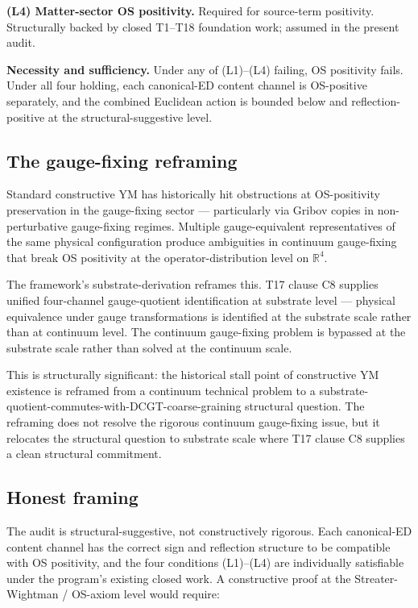\documentclass[11pt,a4paper]{article}
\begin{document}
\textbf{(L4) Matter-sector OS positivity.} Required for source-term positivity. Structurally backed by closed T1--T18 foundation work; assumed in the present audit.

\textbf{Necessity and sufficiency.} Under any of (L1)--(L4) failing, OS positivity fails. Under all four holding, each canonical-ED content channel is OS-positive separately, and the combined Euclidean action is bounded below and reflection-positive at the structural-suggestive level.

\subsection{The gauge-fixing reframing}

Standard constructive YM has historically hit obstructions at OS-positivity preservation in the gauge-fixing sector --- particularly via Gribov copies in non-perturbative gauge-fixing regimes. Multiple gauge-equivalent representatives of the same physical configuration produce ambiguities in continuum gauge-fixing that break OS positivity at the operator-distribution level on $\mathbb{R}^{4}$.

The framework's substrate-derivation reframes this. T17 clause C8 supplies unified four-channel gauge-quotient identification at substrate level --- physical equivalence under gauge transformations is identified at the substrate scale rather than at continuum level. The continuum gauge-fixing problem is bypassed at the substrate scale rather than solved at the continuum scale.

This is structurally significant: the historical stall point of constructive YM existence is reframed from a continuum technical problem to a substrate-quotient-commutes-with-DCGT-coarse-graining structural question. The reframing does not resolve the rigorous continuum gauge-fixing issue, but it relocates the structural question to substrate scale where T17 clause C8 supplies a clean structural commitment.

\subsection{Honest framing}

The audit is structural-suggestive, not constructively rigorous. Each canonical-ED content channel has the correct sign and reflection structure to be compatible with OS positivity, and the four conditions (L1)--(L4) are individually satisfiable under the program's existing closed work. A constructive proof at the Streater-Wightman / OS-axiom level would require:
\end{document}
